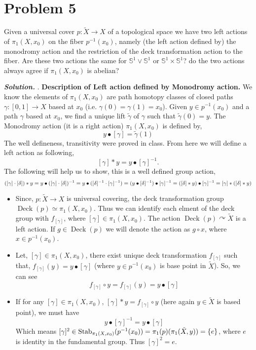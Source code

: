 \documentclass[11pt]{article}
\newcommand{\bb}[1]{\mathbb{#1}}
\newcommand{\s}{\bb{S}}
\newcommand{\sol}{ \textbf{\textit{Solution.}} }
\begin{document}
\section{Problem 5}

\begin{prob}{}{}
    Given a universal cover $p : \widetilde{X} \to X$ of a topological space we have two left actions of $\pi_1(X,x_0)$ on the fiber $p^{-1}(x_0)$, namely (the left action defined by) the monodromy action and the restriction of the deck transformation action to the fiber. Are these two actions the same for $\s^1 \vee \s^1$ or $\s^1 \times \s^1$? do the two actions always agree if $\pi_1(X,x_0)$ is abelian?
\end{prob}

\sol. \textbf{\textsf{Description of Left action defined by Monodromy action.}} We  know the elements of $\pi_1(X,x_0)$ are path homotopy classes of closed paths $\gamma : [0,1] \to X$ based at $x_0$ (i.e. $\gamma(0) = \gamma(1) = x_0$). Given $y \in  p^{-1}(x_0)$ and a path $\gamma$ based at $x_0$, we find a unique lift $\tilde \gamma$ of $\gamma$ such that $\tilde \gamma (0) = y$. The Monodromy action (it is a right action) $\pi_1(X,x_0)$ is defined by, 
$$y\bullet [\gamma]= \tilde{\gamma}(1)$$
The well defineness, transitivity were proved in class. From here we will define a left action as following,
$$[\gamma] * y = y \bullet [\gamma]^{-1} .$$
The following will help us to show, this is a well defined group action, 
$$([\gamma] \cdot [\delta]) * y = y \bullet ([\gamma] \cdot [\delta])^{-1} = y \bullet ([\delta]^{-1} \cdot [\gamma]^{-1}) = (y \bullet [\delta]^{-1}) \bullet [\gamma]^{-1} = ([\delta] * y ) \bullet [\gamma]^{-1} \\= [\gamma] * ([\delta] * y)$$
\begin{itemize}
  \item Since, $p : \tilde{X} \to X$ is universal covering, the deck transformation group $\operatorname{Deck}(p)\simeq \pi_1(X,x_0)$. Thus we can identify each elment of the deck group with $f_{[\gamma]}$, where $[\gamma] \in \pi_1(X,x_0)$. The action $\operatorname{Deck} (p) \curvearrowright \tilde{X}$ is a left action. If $g\in \operatorname{Deck}(p)$ we will denote the action as $g \circ x$, where $x \in p^{-1}(x_0)$.
  \item Let, $[\gamma] \in \pi_1(X,x_0)$, there exist unique deck transformation $f_{[\gamma]}$ such that, $f_{[\gamma]}(y) = y\bullet [\gamma]$ (where $y \in p^{-1}(x_0)$ is base point in $\tilde{X}$). So, we can see $$f_{[\gamma]} \circ y = f_{[\gamma]}(y)= y \bullet [\gamma]$$
  \item If for any $[\gamma] \in \pi_1(X,x_0)$, $[\gamma]\ast y = f_{[\gamma]} \circ y$ (here again $y \in \tilde{X}$ is based point), we must have $$y \bullet [\gamma]^{-1} = y \bullet [\gamma]$$
  Which means $[\gamma]^2 \in \operatorname{Stab}_{\pi_1(X,x_0)}(p^{-1}(x_0)) = \pi_1(p)(\pi_1(\tilde{X},y))= \qty{e}$, where $e$ is identity in the fundamental group. Thus $[\gamma]^2 = e$.
\end{itemize}
\end{document}
